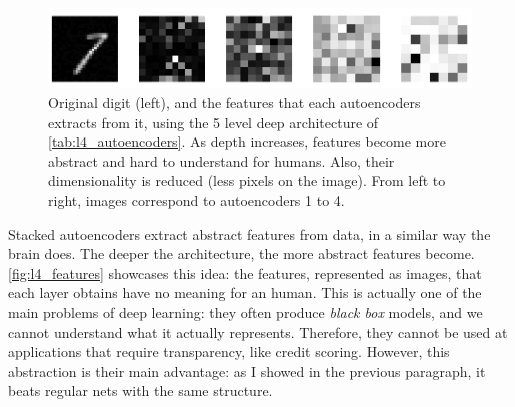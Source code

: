 \documentclass[a4paper, 10pt]{article}
\begin{document}
    \begin{figure}[htpb]
      \centering
      \includegraphics[width=\linewidth]{lab4/layer_features.png}
      \caption{Original digit (left), and the features that each autoencoders 
        extracts from it, using the 5 level deep architecture of 
        \autoref{tab:l4_autoencoders}. As depth increases,
        features become more abstract and hard to understand for humans. Also,
        their dimensionality is reduced (less pixels on the image). From left to
        right, images correspond to autoencoders 1 to 4.}
      \label{fig:l4_features}
    \end{figure}

    Stacked autoencoders extract abstract features from data, in a similar way
    the brain does. The deeper the architecture, the more abstract features become.
    \autoref{fig:l4_features} showcases this idea: the features, represented as 
    images, that each layer obtains have no meaning for an human. This is actually
    one of the main problems of deep learning: they often produce \emph{black box}
    models, and we cannot understand what it actually represents. Therefore, they
    cannot be used at applications that require transparency, like credit scoring.
    However, this abstraction is their main advantage: as I showed in the previous
    paragraph, it beats regular nets with the same structure. 
\end{document}
